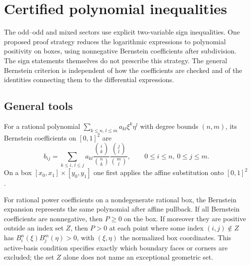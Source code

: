 \chapter{Certified polynomial inequalities}
\label{chap:certificates}

The odd--odd and mixed sectors use explicit two-variable sign inequalities.
One proposed proof strategy reduces the logarithmic expressions to polynomial
positivity on boxes, using nonnegative Bernstein coefficients after subdivision.
The sign statements themselves do not prescribe this strategy. The general
Bernstein criterion is independent of how the coefficients are checked and
of the identities connecting them to the differential expressions.

\section{General tools}

\begin{definition}
\label{def:bernstein}
\leanok
For a rational polynomial $\sum_{k\le n,\,l\le m}a_{kl}\xi^k\eta^l$
with degree bounds $(n,m)$,
its Bernstein coefficients on $[0,1]^2$ are
\[
  b_{ij}=\sum_{k\le i,\,l\le j}a_{kl}\frac{\binom ik}{\binom nk}\frac{\binom jl}{\binom ml},
  \qquad 0\le i\le n,\ 0\le j\le m .
\]
On a box $[x_0,x_1]\times[y_0,y_1]$ one first applies the affine substitution
onto $[0,1]^2$.
\end{definition}

\begin{lemma}
\label{lem:bernstein-positivity}
\leanok
For rational power coefficients on a nondegenerate rational box, the Bernstein
expansion represents the same polynomial after affine pullback.
If all Bernstein coefficients are nonnegative, then $P\ge0$ on the box.
If moreover they are positive outside an index set $Z$, then $P>0$ at each
point where some index $(i,j)\notin Z$ has
$B_i^n(\xi)B_j^m(\eta)>0$, with $(\xi,\eta)$ the normalized box coordinates.
This active-basis condition specifies exactly which boundary faces or corners
are excluded; the set $Z$ alone does not name an exceptional geometric set.
\end{lemma}

